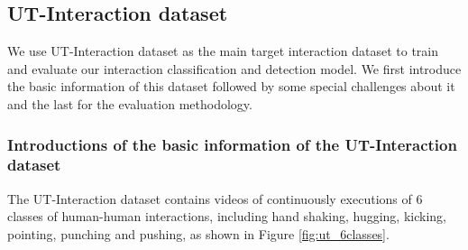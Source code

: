 \subsection{UT-Interaction dataset}
\label{ut-interaction}
We use UT-Interaction dataset \cite{ut2010} as the main target interaction dataset to train and evaluate our interaction classification and detection model. We first introduce the basic information of this dataset followed by some special challenges about it and the last for the evaluation methodology.
\subsubsection*{Introductions of the basic information of the UT-Interaction dataset}
The UT-Interaction dataset contains videos of continuously executions of 6 classes of human-human interactions, including hand shaking, hugging, kicking, pointing, punching and pushing, as shown in Figure \ref{fig:ut_6classes}.

